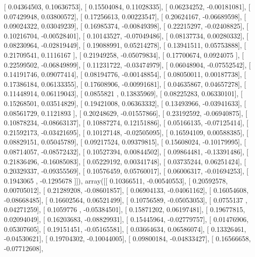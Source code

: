 \documentclass{article}
\begin{document}
       [ 0.04364503,  0.10636753],
       [ 0.15504084,  0.11028335],
       [ 0.06234252, -0.00181081],
       [ 0.07429948,  0.03800572],
       [ 0.17256613,  0.00223547],
       [ 0.20624167, -0.06689598],
       [ 0.09024322,  0.03049239],
       [ 0.16985374, -0.00849398],
       [ 0.22215297, -0.02408825],
       [ 0.10216704, -0.00528401],
       [ 0.10143527, -0.07049486],
       [ 0.08137734,  0.00280332],
       [ 0.08230964, -0.02819449],
       [ 0.19088991,  0.05214278],
       [ 0.13941511,  0.05753888],
       [ 0.21709541,  0.1116167 ],
       [ 0.21949258, -0.05079834],
       [ 0.17700674,  0.0924075 ],
       [ 0.22599502, -0.06849899],
       [ 0.11231722, -0.03474979],
       [ 0.06048904, -0.07552542],
       [ 0.14191746,  0.09077414],
       [ 0.08194776, -0.00148854],
       [ 0.08050011,  0.00187738],
       [ 0.17386184,  0.06133355],
       [ 0.17608906, -0.00991681],
       [ 0.04635867,  0.04657278],
       [ 0.11448914,  0.06119043],
       [ 0.0855821 ,  0.13835969],
       [ 0.08225283,  0.06330101],
       [ 0.15268501,  0.03514829],
       [ 0.19421008,  0.06363332],
       [ 0.13493966, -0.03941633],
       [ 0.08561729,  0.1121893 ],
       [ 0.20248629, -0.01557866],
       [ 0.23192592, -0.06940875],
       [ 0.10878234, -0.08663137],
       [ 0.10887274,  0.12151886],
       [ 0.05166135, -0.07125414],
       [ 0.21592173, -0.03421695],
       [ 0.10127148, -0.02505095],
       [ 0.16594109,  0.00588385],
       [ 0.08829151,  0.05045789],
       [ 0.09217524,  0.09379815],
       [ 0.15608024, -0.10179995],
       [ 0.08714057, -0.08572432],
       [ 0.10527394,  0.00844502],
       [ 0.09864481, -0.13391486],
       [ 0.21836496, -0.16085083],
       [ 0.05229192,  0.00341748],
       [ 0.03735244,  0.06251424],
       [ 0.20329337, -0.09355569],
       [ 0.10576459,  0.05760017],
       [ 0.06006317, -0.01694253],
       [ 0.1943065 , -0.1295678 ]]), array([[ 0.10366511, -0.00540553],
       [ 0.20592578,  0.00705012],
       [ 0.21289208, -0.08601857],
       [ 0.06904133, -0.04061162],
       [ 0.16054608, -0.08668485],
       [ 0.16602564,  0.06521499],
       [ 0.10756589, -0.05053053],
       [ 0.0755137 ,  0.04271259],
       [ 0.1059776 , -0.05384501],
       [ 0.15871202,  0.06197481],
       [ 0.19677815,  0.02094049],
       [ 0.16203683, -0.08829931],
       [ 0.15445964, -0.02779757],
       [ 0.01476906,  0.05307605],
       [ 0.19151451, -0.05165581],
       [ 0.03664634,  0.06586074],
       [ 0.13326461, -0.04530621],
       [ 0.19704302, -0.10044005],
       [ 0.09800184, -0.04833427],
       [ 0.16566658, -0.07712608],
\end{document}
